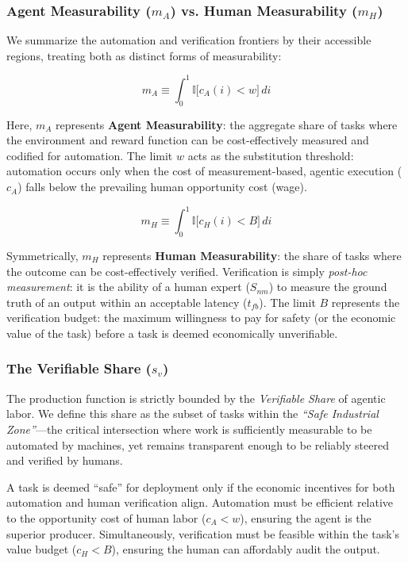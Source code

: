 \documentclass[12pt, letter]{article}
\begin{document}
\subsubsection{Agent Measurability ($m_A$) vs. Human Measurability ($m_H$)}

We summarize the automation and verification frontiers by their accessible regions, treating both as distinct forms of measurability:

\begin{equation}
    m_A \equiv \int_{0}^{1} \mathbb{I}\big[ c_A(i) < w \big] \, di
\end{equation}

Here, $m_A$ represents \textbf{Agent Measurability}: the aggregate share of tasks where the environment and reward function can be cost-effectively measured and codified for automation. The limit $w$ acts as the substitution threshold: automation occurs only when the cost of measurement-based, agentic execution ($c_A$) falls below the prevailing human opportunity cost (wage).

\begin{equation}
    m_H \equiv \int_{0}^{1} \mathbb{I}\big[ c_H(i) < B \big] \, di
\end{equation}

Symmetrically, $m_H$ represents \textbf{Human Measurability}: the share of tasks where the outcome can be cost-effectively verified. Verification is simply \textit{post-hoc measurement}: it is the ability of a human expert ($S_{nm}$) to measure the ground truth of an output within an acceptable latency ($t_{fb}$). The limit $B$ represents the verification budget: the maximum willingness to pay for safety (or the economic value of the task) before a task is deemed economically unverifiable.

\subsubsection{The Verifiable Share ($s_v$)}\label{sec:verifiable_share}

The production function is strictly bounded by the \textit{Verifiable Share} of agentic labor. We define this share as the subset of tasks within the \emph{``Safe Industrial Zone''}---the critical intersection where work is sufficiently measurable to be automated by machines, yet remains transparent enough to be reliably steered and verified by humans.

A task is deemed ``safe'' for deployment only if the economic incentives for both automation and human verification align. Automation must be efficient relative to the opportunity cost of human labor ($c_A < w$), ensuring the agent is the superior producer. Simultaneously, verification must be feasible within the task's value budget ($c_H < B$), ensuring the human can affordably audit the output.
\end{document}
